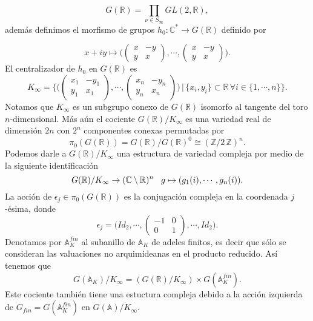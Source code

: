 \documentclass[letterpaper]{report}
\newcommand{\dbz}{\ensuremath{ \mathbb Z }}
\newcommand{\co}{\ensuremath{\mathbb C }}
\newcommand{\re}{\ensuremath{\mathbb R }}
\newcommand{\Ad}{\ensuremath{\mathbb{A}}}
\begin{document}
$$G(\re)=\prod_{\nu\in S_{\infty}}GL(2,\re),$$
además definimos el morfismo de grupos $h_0:\co^*\rightarrow G(\re)$ definido por

\begin{equation}
	x+iy\mapsto
	\bigg(
		\begin{pmatrix}
			x & -y\\
			y & x
		\end{pmatrix},
		\cdots,
		\begin{pmatrix}
			x & -y\\
			y & x
		\end{pmatrix}		
	\bigg).
\end{equation}
\noindent El centralizador de $h_0$ en $G(\re)$ es
$$
	K_{\infty}=
	\Bigg\lbrace
		\bigg(
		\begin{pmatrix}
			x_1 & -y_1\\
			y_1 & x_1
		\end{pmatrix},
		\cdots,
		\begin{pmatrix}
			x_n & -y_n\\
			y_n & x_n
		\end{pmatrix}
		\bigg)\,
		\bigg\vert\,
		\lbrace x_i,y_i\rbrace\subset\re\,\forall i\in\lbrace 1,\cdots,n\rbrace		
	\Bigg\rbrace.
$$
\noindent Notamos que $K_{\infty}$ es un subgrupo conexo de $G(\re)$ isomorfo al tangente del toro $n$-dimensional. Más aún el cociente $G(\re)/K_{\infty}$ es una variedad real de dimensión $2n$ con $2^n$ componentes conexas permutadas por 
$$
	\pi_0(G(\re))=G(\re)/G(\re)^0\cong(\dbz/2\,\dbz)^n.
$$
Podemos darle a $G(\re)/K_{\infty}$ una estructura de variedad compleja por medio de la siguiente identificación
$$
G(\re)/K_{\infty}\rightarrow(\co\setminus\re)^n\hspace{0.3cm}g\mapsto(g_1(i),\cdots,g_n(i)).
$$
\noindent La acción de $\epsilon_j\in\pi_0(G(\re))$ es la conjugación compleja en la coordenada $j$-ésima, donde
$$
	\epsilon_j=
			\bigg(
			Id_2,
			\cdots,
			\begin{pmatrix}
				-1 & 0\\
				0 & 1
			\end{pmatrix},
			\cdots,
			Id_2
			\bigg).
$$
Denotamos por $\Ad^{fin}_K$ al subanillo de $\Ad_K$ de adeles finitos, es decir que sólo se consideran las valuaciones no arquimideanas en el producto reducido. Así tenemos que
$$
G(\Ad_K)/K_{\infty}=(G(\re)/K_{\infty})\times G(\Ad^{fin}_K).
$$
\noindent Este cociente también tiene una estuctura compleja debido a la acción izquierda de $G_{fin}=G(\Ad^{fin}_K)$ en $G(\Ad)/K_{\infty}$.
\end{document}
